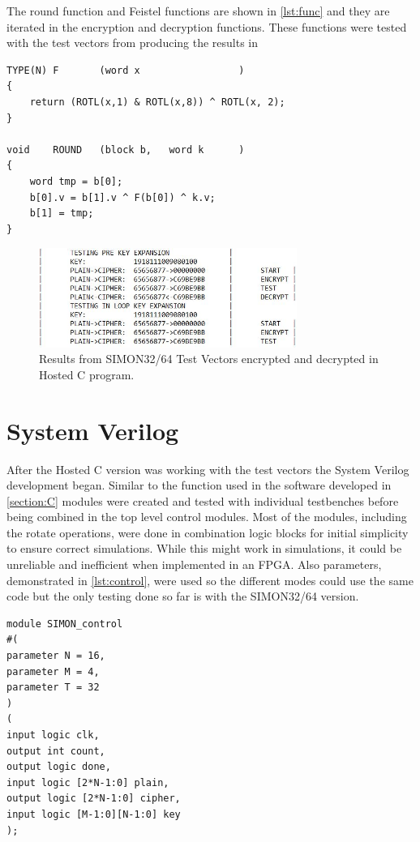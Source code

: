 \documentclass[12pt,twoside,a4paper]{report}
\begin{document}
    The round function and Feistel functions are shown in \autoref{lst:func}     and they are iterated in the encryption and decryption functions. These functions were tested with the test vectors from \cite{Beaulieu2015} producing the results in 
    
    \begin{lstlisting}[label={lst:func},caption={Round and Feistel functions},style=CStyle]
TYPE(N)	F		(word x					)
{
	return (ROTL(x,1) & ROTL(x,8)) ^ ROTL(x, 2);
}

void	ROUND	(block b,	word k		)
{	
	word tmp = b[0];
	b[0].v = b[1].v ^ F(b[0]) ^ k.v;
	b[1] = tmp;
}\end{lstlisting}

    \begin{figure}[H]
        \includegraphics[width=0.75\textwidth]{Hosted_C_Results}
        \centering
        \caption{Results from SIMON32/64 Test Vectors encrypted and decrypted in Hosted C program.}
    \label{Hosted_C_Results}
    \end{figure}
    
    \section{System Verilog}
    After the Hosted C version was working with the test vectors the System Verilog development began. Similar to the function used in the software developed in \autoref{section:C} modules were created and tested with individual testbenches before being combined in the top level control modules. Most of the modules, including the rotate operations, were done in combination logic blocks for initial simplicity to ensure correct simulations. While this might work in simulations, it could be unreliable and inefficient when implemented in an FPGA. Also parameters, demonstrated in \autoref{lst:control}, were used so the different modes could use the same code but the only testing done so far is with the SIMON32/64 version.
    
    \begin{lstlisting}[label={lst:control},caption={Encryption control module},style=CStyle]
module SIMON_control
#(	
parameter N = 16,
parameter M = 4,
parameter T = 32
)
(
input logic clk,
output int count,
output logic done,
input logic [2*N-1:0] plain,
output logic [2*N-1:0] cipher,
input logic [M-1:0][N-1:0] key
);
\end{lstlisting}
    
\end{document}
